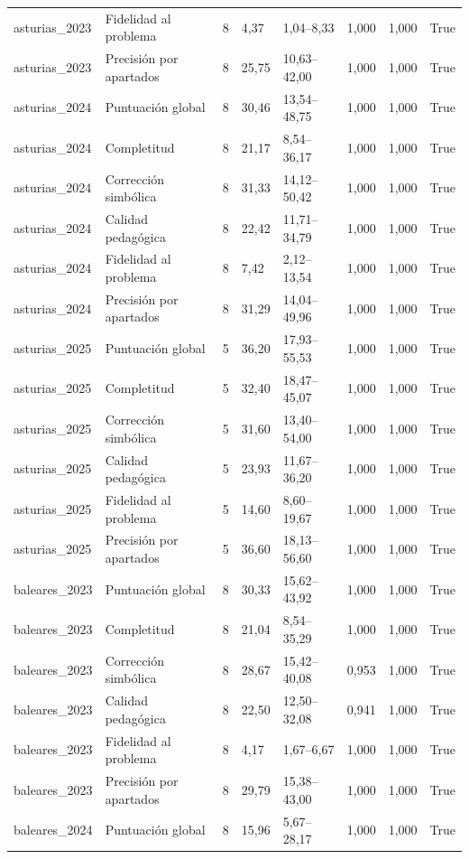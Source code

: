 \begin{tabular}{llrllllr}
asturias\_2023 & Fidelidad al problema & 8 & 4,37 & 1,04–8,33 & 1,000 & 1,000 & True \\
asturias\_2023 & Precisión por apartados & 8 & 25,75 & 10,63–42,00 & 1,000 & 1,000 & True \\
asturias\_2024 & Puntuación global & 8 & 30,46 & 13,54–48,75 & 1,000 & 1,000 & True \\
asturias\_2024 & Completitud & 8 & 21,17 & 8,54–36,17 & 1,000 & 1,000 & True \\
asturias\_2024 & Corrección simbólica & 8 & 31,33 & 14,12–50,42 & 1,000 & 1,000 & True \\
asturias\_2024 & Calidad pedagógica & 8 & 22,42 & 11,71–34,79 & 1,000 & 1,000 & True \\
asturias\_2024 & Fidelidad al problema & 8 & 7,42 & 2,12–13,54 & 1,000 & 1,000 & True \\
asturias\_2024 & Precisión por apartados & 8 & 31,29 & 14,04–49,96 & 1,000 & 1,000 & True \\
asturias\_2025 & Puntuación global & 5 & 36,20 & 17,93–55,53 & 1,000 & 1,000 & True \\
asturias\_2025 & Completitud & 5 & 32,40 & 18,47–45,07 & 1,000 & 1,000 & True \\
asturias\_2025 & Corrección simbólica & 5 & 31,60 & 13,40–54,00 & 1,000 & 1,000 & True \\
asturias\_2025 & Calidad pedagógica & 5 & 23,93 & 11,67–36,20 & 1,000 & 1,000 & True \\
asturias\_2025 & Fidelidad al problema & 5 & 14,60 & 8,60–19,67 & 1,000 & 1,000 & True \\
asturias\_2025 & Precisión por apartados & 5 & 36,60 & 18,13–56,60 & 1,000 & 1,000 & True \\
baleares\_2023 & Puntuación global & 8 & 30,33 & 15,62–43,92 & 1,000 & 1,000 & True \\
baleares\_2023 & Completitud & 8 & 21,04 & 8,54–35,29 & 1,000 & 1,000 & True \\
baleares\_2023 & Corrección simbólica & 8 & 28,67 & 15,42–40,08 & 0,953 & 1,000 & True \\
baleares\_2023 & Calidad pedagógica & 8 & 22,50 & 12,50–32,08 & 0,941 & 1,000 & True \\
baleares\_2023 & Fidelidad al problema & 8 & 4,17 & 1,67–6,67 & 1,000 & 1,000 & True \\
baleares\_2023 & Precisión por apartados & 8 & 29,79 & 15,38–43,00 & 1,000 & 1,000 & True \\
baleares\_2024 & Puntuación global & 8 & 15,96 & 5,67–28,17 & 1,000 & 1,000 & True \\

\end{tabular}
